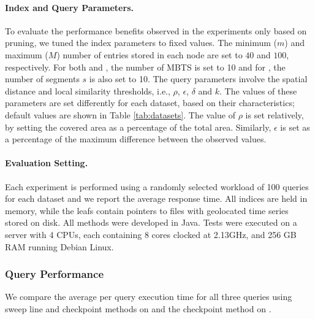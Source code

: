 \paragraph{Index and Query Parameters.} To evaluate the performance benefits observed in the experiments only based on pruning, we tuned the index parameters to fixed values. The minimum ($m$) and maximum ($M$) number of entries stored in each node are set to $40$ and $100$, respectively. For both \btsr and \sbtsr, the number of MBTS is set to 10 and for \sbtsr, the number of segments $s$ is also set to 10. The query parameters involve the spatial distance and local similarity thresholds, i.e., $\rho$, $\epsilon$, $\delta$ and $k$. The values of these parameters are set differently for each dataset, based on their characteristics; default values are shown in Table \ref{tab:datasets}. The value of $\rho$ is set relatively, by setting the covered area as a percentage of the total area. Similarly, $\epsilon$ is set as a percentage of the maximum difference between the observed values.

\paragraph{Evaluation Setting.} Each experiment is performed using a randomly selected workload of 100 queries for each dataset and we report the average response time. All indices are held in memory, while the leafs contain pointers to files with geolocated time series stored on disk. All methods were developed in Java. Tests were executed on a server with 4 CPUs, each containing 8 cores clocked at 2.13GHz, and 256 GB RAM running Debian Linux.

\subsubsection{Query Performance}
\label{subsec:query_perf}

We compare the average per query execution time for all three queries using sweep line and checkpoint methods on \btsr and the checkpoint method on \sbtsr.

